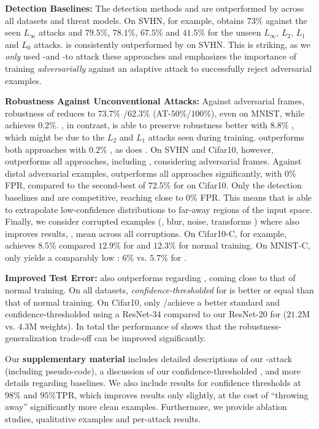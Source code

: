 \textbf{Detection Baselines:}
%
The detection methods \Ma and \Lee are outperformed by \ConfTrain across all datasets and threat models. On SVHN, for example, \Lee obtains $73\%$ \RTE against the seen $L_\infty$ attacks and $79.5\%$, $78.1\%$, $67.5\%$ and $41.5\%$ \RTE for the unseen $L_\infty$, $L_2$, $L_1$ and $L_0$ attacks. \Ma is consistently outperformed by \Lee on SVHN. This is striking, as we \emph{only} used \PGD-\FCE and \PGD-\FConf to attack these approaches and emphasizes the importance of training \emph{adversarially} against an adaptive attack to successfully reject adversarial examples.

\textbf{Robustness Against Unconventional Attacks:}
%
Against adversarial frames, robustness of \AdvTrain reduces to $73.7\%$ /$62.3\%$ \RTE (AT-$50\%$/$100\%$), even on MNIST, while \ConfTrain achieves $0.2\%$. \Wong, in contrast, is able to preserve robustness better with $8.8\%$ \RTE, which might be due to the $L_2$ and $L_1$ attacks seen during training. \ConfTrain outperforms both approaches with $0.2\%$ \RTE, as does \TRADES. On SVHN and Cifar10, however, \ConfTrain outperforms all approaches, including \TRADES, considering adversarial frames.
Against distal adversarial examples, \ConfTrain outperforms all approaches significantly, with $0\%$ FPR, compared to the second-best of $72.5\%$ for \AdvTrainFull on Cifar10. Only the detection baselines \Ma and \Lee are competitive, reaching close to $0\%$ FPR.
This means that \ConfTrain is able to extrapolate low-confidence distributions to far-away regions of the input space.
Finally, we consider corrupted examples (\eg, blur, noise, transforms \etc) where \ConfTrain also improves results, \ie, mean \TE across all corruptions. On Cifar10-C, for example, \ConfTrain achieves $8.5\%$ compared $12.9\%$ for \MadryAT and $12.3\%$ for normal training. On MNIST-C, only \Wong yields a comparably low \TE: $6\%$ vs. $5.7\%$ for \ConfTrain.

\textbf{Improved Test Error:}
%
\ConfTrain also outperforms \AdvTrain regarding \TE, coming close to that of normal training. On all datasets, \emph{confidence-thresholded} \TE for \ConfTrain is better or equal than that of normal training. On Cifar10, only \Ma/\Lee achieve a better standard and confidence-thresholded \TE using a ResNet-34 compared to our ResNet-20 for \ConfTrain ($21.2\text{M}$ vs. $4.3\text{M}$ weights). In total the performance of \ConfTrain shows that the robustness-generalization trade-off can be improved significantly.

Our \textbf{supplementary material} includes detailed descriptions of our \PGD-\FConf attack (including pseudo-code), a discussion of our confidence-thresholded \RTE, and more details regarding baselines. We also include results for confidence thresholds at $98\%$ and $95\%$TPR, which improves results only slightly, at the cost of ``throwing away'' significantly more clean examples. Furthermore, we provide ablation studies, qualitative examples and per-attack results.
